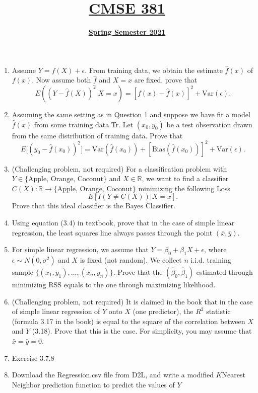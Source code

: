 \documentclass[11pt]{article}
\title{\underline{CMSE 381 }}
\author{\underline{\textbf{Spring Semester 2021}}}
\date{}
\newcommand{\blankline}{\quad\pagebreak[2]}
\begin{document}
\maketitle

\blankline

\begin{enumerate}
	\item Assume $Y = f(X) + \epsilon$. From training data, we obtain the estimate $\hat{f}(x)$ of $f(x)$. Now assume both $\hat{f}$ and $X = x$ are fixed. prove that
	\[
	  E( (Y - \hat{f}(X))^2 | X = x) = [f(x) - \hat{f}(x)]^2 + \text{Var}(\epsilon).
	\]
	\item Assuming the same setting as in Question 1 and suppose we have fit a model $\hat{f}(x)$ from some training data Tr. Let $(x_0, y_0)$ be a test observation drawn from the same distribution of training data. Prove that
	\[
	  E\bigg[(y_0 - \hat{f}(x_0))^2 \bigg] = \text{Var}(\hat{f}(x_0)) + [ \text{Bias}(\hat{f}(x_0))  ]^2 + \text{Var}(\epsilon).
	\]
	\item (Challenging problem, not required) For a classification problem with $Y \in \{ \text{Apple, Orange, Coconut} \}$ and $X \in \mathbb{R}$, we want to find a classifier $C(X): \mathbb{R}\rightarrow \{ \text{Apple, Orange, Coconut} \}$ minimizing the following Loss
	\[
	   E\left[  I(Y \neq C(X))| X = x \right].
	\]
Prove that this ideal classifier is the Bayes Classifier.	
	\item  Using equation (3.4) in textbook, prove that in the case of simple linear regression, the least squares line always passes through the point $( \bar{x}, \bar{y})$.
	\item For simple linear regression, we assume that $Y = \beta_0 + \beta_1 X + \epsilon$, where $\epsilon \sim N(0, \sigma^2)$ and $X$ is fixed (not random). We collect $n$ i.i.d. training sample $\{(x_1, y_1), \ldots, (x_n, y_n)\}$. Prove that the $(\hat{\beta}_0, \hat{\beta}_1)$ estimated through minimizing RSS equals to the one through maximizing likelihood. 
	\item  (Challenging problem, not required) It is claimed in the book that in the case of simple linear regression of $Y$ onto $X$ (one predictor), the $R^2$ statistic (formula 3.17 in the book) is equal to the square of the correlation between $X$ and $Y$ (3.18). Prove that this is the case. For simplicity, you may assume that $\bar{x} = \bar{y} = 0$.
	\item Exercise 3.7.8
	\item Download the Regression.csv file from D2L, and write a modified $K$Nearest Neighbor prediction function to predict the values of $Y$ 

\end{enumerate}
\end{document}
